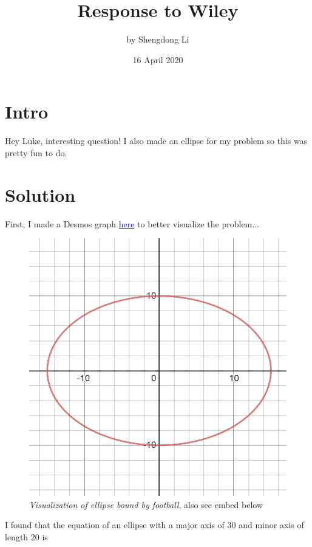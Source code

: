 \documentclass[letterpaper, 12pt]{article}
\begin{document}
\title{Response to Wiley}
\author{by Shengdong Li}
\date{16 April 2020}
\maketitle

\section{Intro}
Hey Luke, interesting question! I also made an ellipse for my problem so this was pretty fun to do.

\section{Solution}
First, I made a Desmos graph \href{https://www.desmos.com/calculator/kafvvkvlcy}{\textcolor{blue}{here}} to better visualize the problem... \par
\begin{figure}[h]
    \begin{center}
        \includegraphics[scale=.3]{football.png}
        \caption{\textit{Visualization of ellipse bound by football}, also see embed below}
    \end{center}
\end{figure}
I found that the equation of an ellipse with a major axis of $30$ and minor axis of length $20$ is
\end{document}
